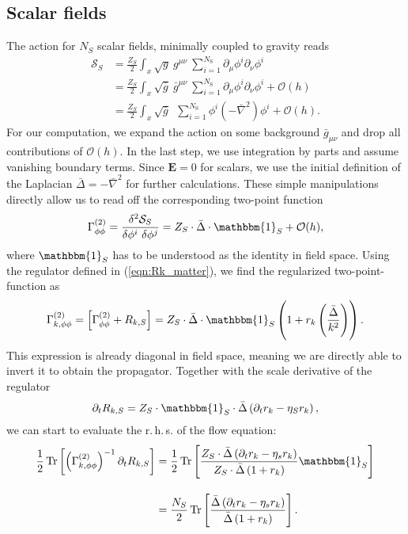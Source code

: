 \subsection{Scalar fields}
The action for $N_S$ scalar fields, minimally coupled to gravity reads
\begin{align}
	\mathcal{S}_S &= \frac{Z_{S}}{2}\int_x \sqrt{g} \ g^{\mu\nu} \ \sum\limits_{i=1}^{N_{\text{S}}} \partial_{\mu}\phi^{i}\partial_{\nu}\phi^{i} \nonumber \\
&=  \frac{Z_{S}}{2}\int_x \sqrt{\bar{g}} \ \bar{g}^{\mu\nu} \ \sum\limits_{i=1}^{N_{\text{S}}} \partial_{\mu}\phi^{i}\partial_{\nu}\phi^{i} + \mathcal{O}(h) \\
&= \frac{Z_{S}}{2}\int_x \sqrt{\bar{g}} \ \ \sum\limits_{i=1}^{N_{\text{S}}} \phi^{i}\left(-\bar{\nabla}^2\right)\phi^{i} + \mathcal{O}(h). \nonumber
\end{align}
For our computation, we expand the action on some background $\bar{g}_{\mu\nu}$ and drop all contributions of $\mathcal{O}(h)$. In the last step, we use integration by parts and assume vanishing boundary terms. Since $\mathbf{E} =0$ for scalars, we use the initial definition of the Laplacian $\bar{\Delta} = -\bar{\nabla}^2$ for further calculations. These simple manipulations directly allow us to read off the corresponding two-point function
\begin{align}
	\Gamma^{(2)}_{\phi\phi} = \frac{\delta^2 \mathcal{S}_S}{\delta\phi^{i}\ \delta\phi^{j}} = Z_S \cdot\bar{\Delta}\cdot\mathbbm{1}_S + \mathcal{O}(h),
\end{align}
where $\mathbbm{1}_S$ has to be understood as the identity in field space. Using the regulator defined in (\ref{eqn:Rk_matter}), we find the regularized two-point-function as
\begin{align}
	\Gamma^{(2)}_{k, \phi\phi} = \left[\Gamma^{(2)}_{\phi\phi}+ R_{k, S}\right]  = Z_S \cdot\bar{\Delta}\cdot\mathbbm{1}_S\left(1 + r_k\left(\frac{\bar{\Delta}}{k^2}\right)\right).
\end{align}
This expression is already diagonal in field space, meaning we are directly able to invert it to obtain the propagator. Together with the scale derivative of the regulator
\begin{align}
	\partial_t R_{k, S} = Z_S\cdot\mathbbm{1}_S\cdot\bar{\Delta}\left(\partial_t r_k - \eta_S r_k\right),
\end{align}
we can start to evaluate the r.\,h.\,s. of the flow equation:
\begin{equation}
\begin{aligned}
	\frac{1}{2}\tr{\left(\Gamma^{(2)}_{k, \phi\phi}\right)^{-1}\partial_t R_{k,S}} &= \frac{1}{2}\tr{\frac{Z_S\cdot\bar{\Delta}\left(\partial_t r_k - \eta_s r_k\right)}{Z_S \cdot\bar{\Delta}\left(1 + r_k\right)}\mathbbm{1}_S}\\[10pt]
	&=   \frac{N_S}{2}\tr{\frac{\bar{\Delta}\left(\partial_t r_k - \eta_s r_k\right)}{\bar{\Delta}\left(1 + r_k\right)}}. 
\end{aligned}
\end{equation}
